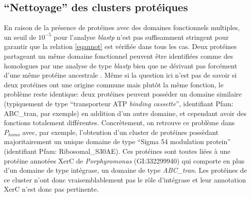 \subsection{“Nettoyage” des clusters protéiques}\label{parcleaning}
	En raison de la présence de protéines avec des domaines fonctionnels multiples, un seuil de $10^{-5}$ pour l'analyse \textit{blastp} n'est pas suffisamment stringent pour garantir que la relation \ref{eqannot} est vérifiée dans tous les cas. Deux protéines partageant un même domaine fonctionnel peuvent être identifiées comme des homologues par une analyse de type \textit{blastp} bien que ne dérivant pas forcément d'une même protéine ancestrale \citep{Song2007}. Même si la question ici n'est pas de savoir si deux protéines ont une origine commune mais plutôt la même fonction, le problème reste identique: deux protéines peuvent posséder un domaine similaire (typiquement de type “transporteur ATP \textit{binding cassette}”, identifiant Pfam: ABC\_tran, par exemple) en addition d'un autre domaine, et cependant avoir des fonctions totalement différentes. Concrètement, on retrouve ce problème dans $P_{homo}$ avec, par exemple, l'obtention d'un cluster de protéines possèdant majoritairement un unique domaine de type “Sigma 54 modulation protein” (identifiant Pfam: Ribosomal\_S30AE). Ces protéines sont toutes liées à une protéine annotées XerC de \textit{Porphyromonas} (GI:332299940) qui comporte en plus d'un domaine de type intégrase, un domaine de type \textit{ABC\_tran}. Les protéines de ce cluster n'ont donc vraisemblablement pas le rôle d'intégrase et leur annotation XerC n'est donc pas pertinente.



